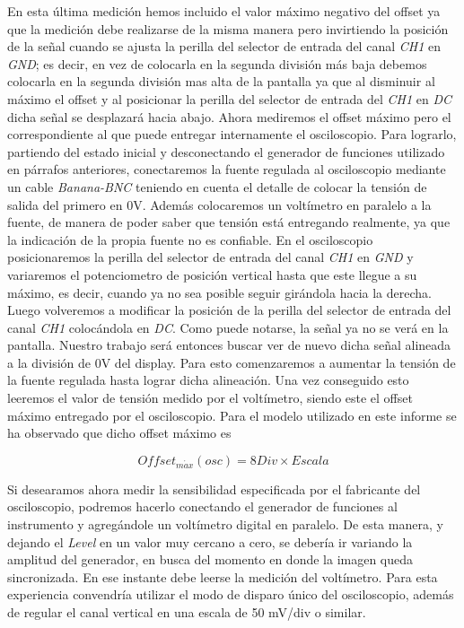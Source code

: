 \documentclass{article}
\begin{document}
\noindent En esta última medición hemos incluido el valor máximo negativo del offset ya que la medición debe realizarse de la misma manera pero invirtiendo la posición de la señal cuando se ajusta la perilla del selector de entrada del canal \textit{CH1} en \textit{GND}; es decir, en vez de colocarla en la segunda división más baja debemos colocarla en la segunda división mas alta de la pantalla ya que al disminuir al máximo el offset y al posicionar la perilla del selector de entrada del \textit{CH1} en \textit{DC} dicha señal se desplazará hacia abajo.
	\newpage
	Ahora mediremos el offset máximo pero el correspondiente al que puede entregar internamente el osciloscopio. Para lograrlo, partiendo del estado inicial y desconectando el generador de funciones utilizado en párrafos anteriores, conectaremos la fuente regulada al osciloscopio mediante un cable \textit{Banana-BNC} teniendo en cuenta el detalle de colocar la tensión de salida del primero en 0V. Además colocaremos un voltímetro en paralelo a la fuente, de manera de poder saber que tensión está entregando realmente, ya que la indicación de la propia fuente no es confiable. En el osciloscopio posicionaremos la perilla del selector de entrada del canal \textit{CH1} en \textit{GND} y variaremos el potenciometro de posición vertical hasta que este llegue a su máximo, es decir, cuando ya no sea posible seguir girándola hacia la derecha. Luego volveremos a modificar la posición de la perilla del selector de entrada del canal \textit{CH1} colocándola en \textit{DC}. Como puede notarse, la señal ya no se verá en la pantalla. Nuestro trabajo será entonces buscar ver de nuevo dicha señal alineada a la división de 0V del display. Para esto comenzaremos a aumentar la tensión de la fuente regulada hasta lograr dicha alineación. Una vez conseguido esto leeremos el valor de tensión medido por el voltímetro, siendo este el offset máximo entregado por el osciloscopio. Para el modelo utilizado en este informe se ha observado que dicho offset máximo es 

\begin{equation*}
	Offset_{m\acute{a}x}(osc) = 8 Div \times Escala
\end{equation*}
\medskip


	Si desearamos ahora medir la sensibilidad especificada por el fabricante del osciloscopio, podremos hacerlo conectando el generador de funciones al instrumento y agregándole un voltímetro digital en paralelo. De esta manera, y dejando el \textit{Level} en un valor muy cercano a cero, se debería ir variando la amplitud del generador, en busca del momento en donde la imagen queda sincronizada. En ese instante debe leerse la medición del voltímetro. Para esta experiencia convendría utilizar el modo de disparo único del osciloscopio, además de regular el canal vertical en una escala de 50 mV/div o similar.
\bigskip
\end{document}
